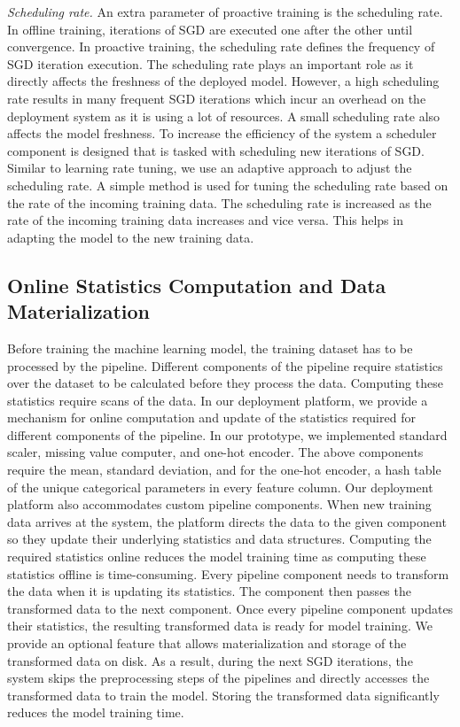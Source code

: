 \textit{Scheduling rate.}
An extra parameter of proactive training is the scheduling rate.
In offline training, iterations of SGD are executed one after the other until convergence.
In proactive training, the scheduling rate defines the frequency of SGD iteration execution.
The scheduling rate plays an important role as it directly affects the freshness of the deployed model.
However, a high scheduling rate results in many frequent SGD iterations which incur an overhead on the deployment system as it is using a lot of resources.
A small scheduling rate also affects the model freshness.
To increase the efficiency of the system a scheduler component is designed that is tasked with scheduling new iterations of SGD.
Similar to learning rate tuning, we use an adaptive approach to adjust the scheduling rate.
A simple method is used for tuning the scheduling rate based on the rate of the incoming training data.
The scheduling rate is increased as the rate of the incoming training data increases and vice versa.
This helps in adapting the model to the new training data.

\subsection{Online Statistics Computation and Data Materialization}
Before training the machine learning model, the training dataset has to be processed by the pipeline.
Different components of the pipeline require statistics over the dataset to be calculated before they process the data.
Computing these statistics require scans of the data.
In our deployment platform, we provide a mechanism for online computation and update of the statistics required for different components of the pipeline.
In our prototype, we implemented standard scaler, missing value computer, and one-hot encoder.
The above components require the mean, standard deviation, and for the one-hot encoder, a hash table of the unique categorical parameters in every feature column.
Our deployment platform also accommodates custom pipeline components.
When new training data arrives at the system, the platform directs the data to the given component so they update their underlying statistics and data structures.
Computing the required statistics online reduces the model training time as computing these statistics offline is time-consuming.
Every pipeline component needs to transform the data when it is updating its statistics.
The component then passes the transformed data to the next component.
Once every pipeline component updates their statistics, the resulting transformed data is ready for model training.
We provide an optional feature that allows materialization and storage of the transformed data on disk.
As a result, during the next SGD iterations, the system skips the preprocessing steps of the pipelines and directly accesses the transformed data to train the model.
Storing the transformed data significantly reduces the model training time.

